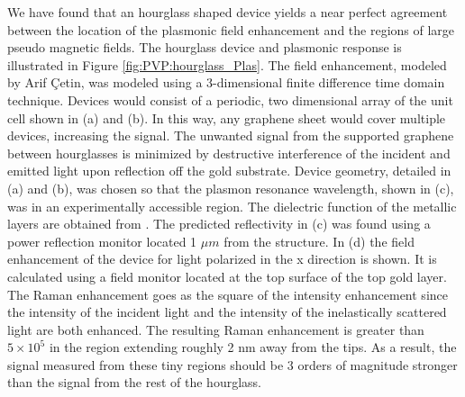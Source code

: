 We have found that an hourglass shaped device yields a near perfect agreement between the location of the plasmonic field enhancement and the regions of large pseudo magnetic fields.
The hourglass device and plasmonic response is illustrated in Figure \ref{fig:PVP:hourglass_Plas}.
The field enhancement, modeled by Arif \c{C}etin, was modeled using a 3-dimensional finite difference time domain technique.
Devices would consist of a periodic, two dimensional array of the unit cell shown in (a) and (b).
In this way, any graphene sheet would cover multiple devices, increasing the signal.
The unwanted signal from the supported graphene between hourglasses is minimized by destructive interference of the incident and emitted light upon reflection off the gold substrate.
Device geometry, detailed in (a) and (b), was chosen so that the plasmon resonance wavelength, shown in (c), was in an experimentally accessible region.
The dielectric function of the metallic layers are obtained from \cite{Palik1985}.
The predicted reflectivity in (c) was found using a power reflection monitor located 1 $\mu m$ from the structure.
In (d) the field enhancement of the device for light polarized in the x direction is shown.
It is calculated using a field monitor located at the top surface of the top gold layer.
The Raman enhancement goes as the square of the intensity enhancement since the intensity of the incident light and the intensity of the inelastically scattered light are both enhanced.
The resulting Raman enhancement is greater than $5 \times 10^5$ in the region extending roughly 2 nm away from the tips.
As a result, the signal measured from these tiny regions should be 3 orders of magnitude stronger than the signal from the rest of the hourglass.

